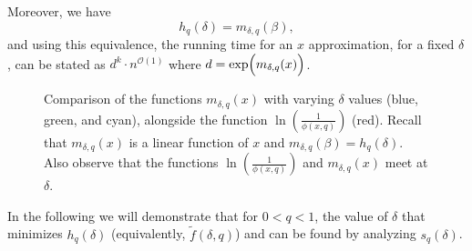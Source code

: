 \documentclass[letterpaper,11pt]{article}
\newcommand{\1}[1]{\mathds{1}\left[#1\right]}
\newcommand{\Oh}{\mathcal{O}}
\begin{document}
Moreover, we have
\begin{equation}\label{eq:m_h_equiv}
	h_{q}(\delta) = m_{\delta,q}(\beta),
\end{equation}
and using this equivalence, the running time for an
$x$ approximation, for a fixed $\delta$, can be stated as $d^{k} \cdot n^{\Oh(1)}$
where $d = \exp\Bigl( m_{\delta,q}(x) \Bigr)$.
\begin{figure}[h!]
	\centering
 	\caption{Comparison of the functions $m_{\delta, q}(x)$ with varying $\delta$ values (blue, green, and cyan), alongside the function $\ln\left( \frac{1}{\phi(x,q)}\right)$ (red). Recall that $m_{\delta, q}(x)$ is a linear function of $x$ and $m_{ \delta, q}(\beta) = h_{ q}(\delta)$. Also observe that the functions $\ln\left( \frac{1}{\phi(x,q)}\right)$ and $m_{ \delta, q}(x)$ meet at $\delta$.
}
	\label{fig:mplots}
\end{figure}

In the following we will demonstrate that for $0 < q < 1$, the value of $\delta$ that minimizes $h_{q}(\delta)$ (equivalently, $\tilde{f}(\delta, q)$) and can be found by analyzing $s_q(\delta)$.
\end{document}
